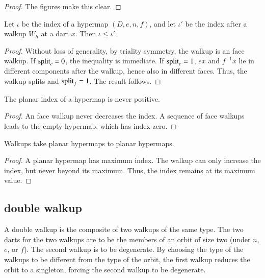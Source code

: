 \begin{proof} The figures make this clear.
\end{proof}

\begin{lemma}
Let $\iota$ be the index of a  hypermap $(D,e,n,f)$, and let $\iota'$ be the index after a walkup $W_h$ at a dart $x$.  Then $\iota \le \iota'$.
\end{lemma} 


\begin{proof}  Without loss of generality, by triality symmetry,  the walkup is an face walkup.  If ${\operatorname{split}}_c=0$, the inequality is immediate.  If ${\operatorname{split}}_c=1$, 
$e x$ and $f^{-1} x$ lie in different components after the walkup, hence also in different faces.  Thus, the walkup splits and ${\operatorname{split}}_f = 1$.  The result follows.
\end{proof}


\begin{lemma}  
The planar index
of a hypermap is never positive.
\end{lemma}

\begin{proof}  An face walkup never decreases the index.  A sequence
of face walkups leads to the empty hypermap, which has
index zero.
\end{proof}


\begin{lemma}
Walkups take planar hypermaps to planar
hypermaps.
\end{lemma}

\begin{proof}  
A planar hypermap has maximum index.  The walkup
can only increase the index, but never beyond its maximum.  
Thus, the index remains at its maximum value.
\end{proof}


\subsection{double walkup}

A double walkup is the composite of two walkups of the same type.  The two darts for the two walkups  are to be the members of an orbit of size two (under $n$, $e$, or $f$).  
The second walkup is to be degenerate. By choosing the type of the walkups to be different from the type of the orbit, the first walkup reduces the orbit to a singleton, forcing the second walkup to be degenerate. 
 
